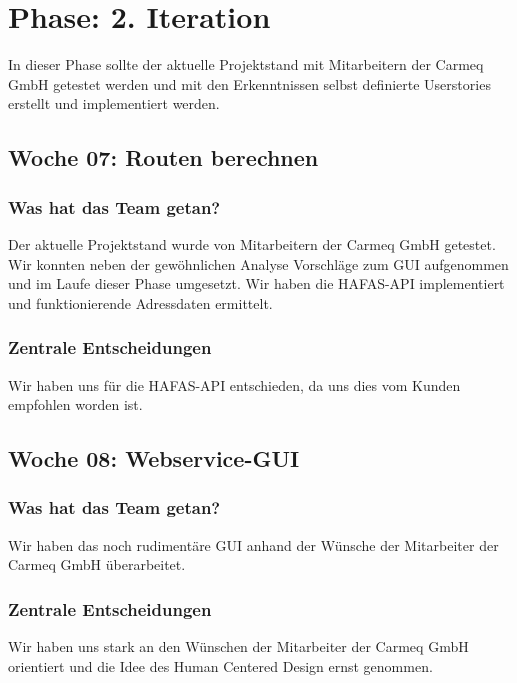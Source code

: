 \documentclass{article}
\begin{document}
\newpage

\section{Phase: 2. Iteration}

In dieser Phase sollte der aktuelle Projektstand mit Mitarbeitern der Carmeq GmbH getestet werden und mit den Erkenntnissen selbst definierte Userstories erstellt und implementiert werden.

\subsection{Woche 07: Routen berechnen}

\subsubsection{Was hat das Team getan?}

Der aktuelle Projektstand wurde von Mitarbeitern der Carmeq GmbH getestet. Wir konnten neben der gew\"ohnlichen Analyse Vorschl\"age zum GUI aufgenommen und im Laufe dieser Phase umgesetzt. Wir haben die HAFAS-API implementiert und funktionierende Adressdaten ermittelt.

\subsubsection{Zentrale Entscheidungen}

Wir haben uns f\"ur die HAFAS-API entschieden, da uns dies vom Kunden empfohlen worden ist.

\subsection{Woche 08: Webservice-GUI}

\subsubsection{Was hat das Team getan?}

Wir haben das noch rudiment\"are GUI anhand der W\"unsche der Mitarbeiter der Carmeq GmbH \"uberarbeitet.

\subsubsection{Zentrale Entscheidungen}

Wir haben uns stark an den W\"unschen der Mitarbeiter der Carmeq GmbH orientiert und die Idee des Human Centered Design ernst genommen.
\end{document}
